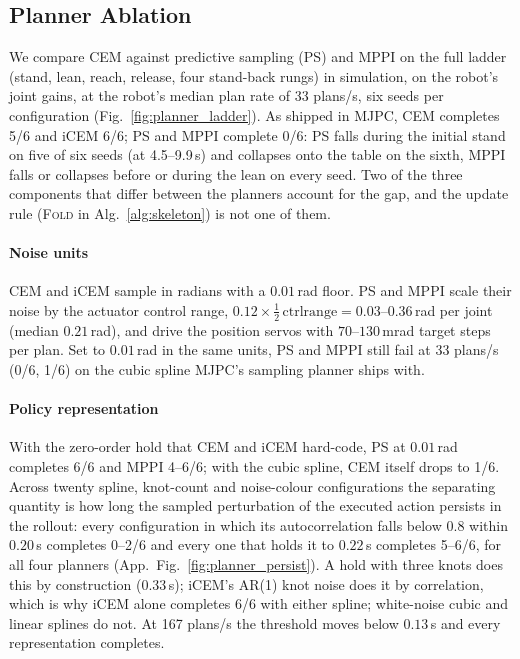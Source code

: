 \subsection{Planner Ablation}\label{sec:planner_ablation}
We compare CEM against predictive sampling (PS) and MPPI on the full ladder
(stand, lean, reach, release, four stand-back rungs) in simulation, on the
robot's joint gains, at the robot's median plan rate of 33 plans/s, six seeds
per configuration (Fig.~\ref{fig:planner_ladder}). As shipped in MJPC, CEM
completes 5/6 and iCEM 6/6; PS and MPPI complete 0/6: PS falls during the initial stand on five of six
seeds (at 4.5--9.9\,s) and collapses onto the table on the sixth, MPPI falls or
collapses before or during the lean on every seed. Two of the three components that differ
between the planners account for the gap, and the update rule
(\textsc{Fold} in Alg.~\ref{alg:skeleton}) is not one of them.

\paragraph{Noise units} CEM and iCEM sample in radians with a $0.01$\,rad
floor. PS and MPPI scale their noise by the actuator control range,
$0.12\times\tfrac12\,\mathrm{ctrlrange}=0.03$--$0.36$\,rad per joint
(median $0.21$\,rad), and drive the position servos with $70$--$130$\,mrad
target steps per plan. Set to $0.01$\,rad in the same units, PS and MPPI
still fail at 33 plans/s (0/6, 1/6) on the cubic spline MJPC's sampling
planner ships with.

\paragraph{Policy representation} With the zero-order hold that CEM and
iCEM hard-code, PS at $0.01$\,rad completes 6/6 and MPPI 4--6/6; with the
cubic spline, CEM itself drops to 1/6. Across twenty spline, knot-count and
noise-colour configurations the separating quantity is how long the sampled
perturbation of the executed action persists in the rollout: every
configuration in which its autocorrelation falls below $0.8$ within
$0.20$\,s completes 0--2/6 and every one that holds it to $0.22$\,s completes
5--6/6, for all four planners (App.~Fig.~\ref{fig:planner_persist}). A hold
with three knots does this by construction ($0.33$\,s); iCEM's AR(1) knot noise
does it by correlation, which is why iCEM alone completes 6/6 with either
spline; white-noise cubic and linear splines do not. At 167 plans/s the
threshold moves below $0.13$\,s and every representation completes.

